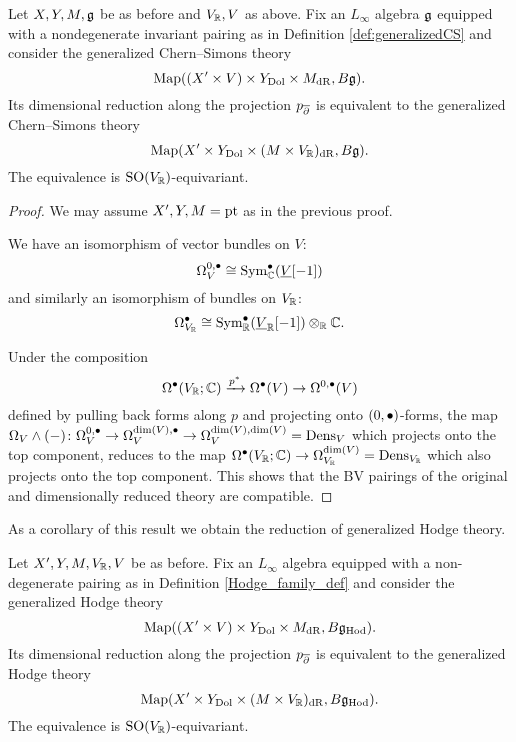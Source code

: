 \documentclass[10pt, oneside]{article}
\newcommand{\Hod}{\mathrm{Hod}}
\begin{document}
\begin{prop} \label{CS_diml_red_prop}
Let $X,Y,M,\mathfrak g$ be as before and $V_\mathbb R, V$ as above. Fix an $L_\infty$ algebra $\mathfrak g$ equipped with a nondegenerate invariant pairing as in Definition \ref{def:generalizedCS} and consider the generalized Chern--Simons theory
\[\operatorname{Map}((X'\times V)\times Y_{\mathrm{Dol}}\times M_{\mathrm{dR}}, B\mathfrak g).\]
Its dimensional reduction along the projection $p_{\overline{\partial}}$ is equivalent to the generalized Chern--Simons theory
\[\operatorname{Map}(X'\times Y_{\mathrm{Dol}}\times (M\times V_\mathbb R)_{\mathrm{dR}}, B\mathfrak g).\]
The equivalence is $\mathrm{SO}(V_\mathbb R)$-equivariant.
\end{prop}
\begin{proof}
We may assume $X',Y,M=\operatorname{pt}$ as in the previous proof.

We have an isomorphism of vector bundles on $V$:
\[\Omega^{0, \bullet}_V\cong {\rm Sym}_\mathbb C^\bullet(\underline{V}[-1])\]
and similarly an isomorphism of bundles on $V_\mathbb R$:
\[\Omega^\bullet_{V_\mathbb R}\cong {\rm Sym}_\mathbb R^\bullet(\underline{V}_\mathbb R[-1])\otimes_\mathbb R\mathbb C.\]

Under the composition
\[\Omega^\bullet(V_\mathbb R; \mathbb C)\xrightarrow{p^*} \Omega^\bullet(V)\rightarrow \Omega^{0, \bullet}(V)\]
defined by pulling back forms along $p$ and projecting onto $(0,\bullet)$-forms, the map $\Omega_V\wedge (-)\colon \Omega^{0, \bullet}_V \to \Omega^{{\rm dim}(V),\bullet}_V \to \Omega^{\dim(V),\dim(V)}_V = {\rm Dens}_V$ which projects onto the top component, reduces to the map $\Omega^{\bullet}(V_\mathbb R;\mathbb C)\rightarrow \Omega^{\dim(V)}_{V_\mathbb R} = {\rm Dens}_{V_\mathbb R}$ which also projects onto the top component. 
This shows that the BV pairings of the original and dimensionally reduced theory are compatible. 
\end{proof}

As a corollary of this result we obtain the reduction of generalized Hodge theory.

\begin{corollary}
Let $X', Y, M, V_\mathbb R, V$ be as before. 
Fix an $L_\infty$ algebra equipped with a non-degenerate pairing as in Definition \ref{Hodge_family_def} and consider the generalized Hodge theory
\[\map((X'\times V)\times Y_{\mr{Dol}}\times M_{\mr{dR}}, B\fg_\Hod).\]
Its dimensional reduction along the projection $p_{\overline{\partial}}$ is equivalent to the generalized Hodge theory
\[\map(X'\times Y_{\mr{Dol}}\times (M\times V_\RR)_{\mr{dR}}, B\fg_\Hod).\]
The equivalence is $\mathrm{SO}(V_\mathbb R)$-equivariant.
\label{cor:Hodgeholomorphicreduction}
\end{corollary}
\end{document}
